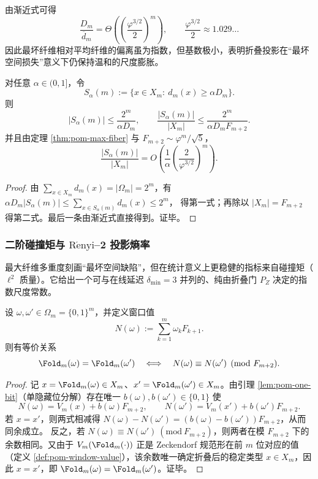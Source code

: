 \begin{remark}[最坏尺度与平均尺度的偏离]\label{rem:pom-defect-gap}
由渐近式可得
\[
\frac{D_m}{\overline d_m}
=
\Theta\!\left(\left(\frac{\varphi^{3/2}}{2}\right)^m\right),
\qquad
\frac{\varphi^{3/2}}{2}\approx 1.029\ldots
\]
因此最坏纤维相对平均纤维的偏离虽为指数，但基数极小，表明折叠投影在“最坏空间损失”意义下仍保持温和的尺度膨胀。
\end{remark}

\begin{corollary}[高多重纤维的稀疏性]\label{cor:pom-high-multiplicity-sparse}
对任意 $\alpha\in(0,1]$，令
\[
S_\alpha(m):=\{x\in X_m:\ d_m(x)\ge \alpha D_m\}.
\]
则
\[
|S_\alpha(m)|\le \frac{2^m}{\alpha D_m},
\qquad
\frac{|S_\alpha(m)|}{|X_m|}\le \frac{2^m}{\alpha D_m F_{m+2}}.
\]
并且由定理 \ref{thm:pom-max-fiber} 与 $F_{m+2}\sim \varphi^m/\sqrt5$，
\[
\frac{|S_\alpha(m)|}{|X_m|}
=O\!\left(\frac{1}{\alpha}\left(\frac{2}{\varphi^{3/2}}\right)^m\right).
\]
\end{corollary}
\begin{proof}
由 $\sum_{x\in X_m} d_m(x)=|\Omega_m|=2^m$，有
\(
\alpha D_m |S_\alpha(m)|\le \sum_{x\in S_\alpha(m)} d_m(x)\le 2^m
\)，
得第一式；再除以 $|X_m|=F_{m+2}$ 得第二式。最后一条由渐近式直接得到。证毕。
\end{proof}

\subsubsection{二阶碰撞矩与 \texorpdfstring{$\mathrm{R\acute{e}nyi}$}{Renyi}--2 投影熵率}\label{subsec:pom-s2}
最大纤维多重度刻画“最坏空间缺陷”，但在统计意义上更稳健的指标来自碰撞矩（\(\ell^2\) 质量）。它给出一个可与在线延迟 \(\delta_{\min}=3\) 并列的、纯由折叠门 \(P_Z\) 决定的指数尺度常数。

\begin{lemma}\label{lem:pom-fold-congruence}
设 \(\omega,\omega'\in\Omega_m=\{0,1\}^m\)，并定义窗口值
$$
N(\omega):=\sum_{k=1}^m \omega_k F_{k+1}.
$$
则有等价关系
$$
\Fold_m(\omega)=\Fold_m(\omega')
\quad\Longleftrightarrow\quad
N(\omega)\equiv N(\omega')\pmod{F_{m+2}}.
$$
\end{lemma}
\begin{proof}
记 \(x=\Fold_m(\omega)\in X_m\)、\(x'=\Fold_m(\omega')\in X_m\)。由引理 \ref{lem:pom-one-bit}（单隐藏位分解）存在唯一 \(b(\omega),b(\omega')\in\{0,1\}\) 使
$$
N(\omega)=V_m(x)+b(\omega)F_{m+2},\qquad
N(\omega')=V_m(x')+b(\omega')F_{m+2}.
$$
若 \(x=x'\)，则两式相减得 \(N(\omega)-N(\omega')=(b(\omega)-b(\omega'))F_{m+2}\)，从而同余成立。
反之，若 \(N(\omega)\equiv N(\omega')\ (\mathrm{mod}\ F_{m+2})\)，则两者在模 \(F_{m+2}\) 下的余数相同。又由于 \(V_m(\Fold_m(\cdot))\) 正是 Zeckendorf 规范形在前 \(m\) 位对应的值（定义 \ref{def:pom-window-value}），该余数唯一确定折叠后的稳定类型 \(x\in X_m\)，因此 \(x=x'\)，即 \(\Fold_m(\omega)=\Fold_m(\omega')\)。证毕。
\end{proof}

